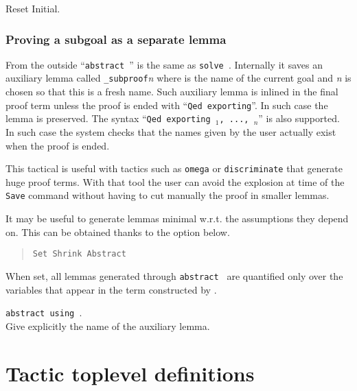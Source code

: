 \begin{coq_eval}
Reset Initial.
\end{coq_eval}

\subsubsection[Proving a subgoal as a separate lemma]{Proving a subgoal as a separate lemma
}

From the outside ``\texttt{abstract \tacexpr}'' is the same as
{\tt solve \tacexpr}. Internally it saves an auxiliary lemma called
{\ident}\texttt{\_subproof}\textit{n} where {\ident} is the name of the
current goal and \textit{n} is chosen so that this is a fresh name.
Such auxiliary lemma is inlined in the final proof term
unless the proof is ended with ``\texttt{Qed exporting}''.  In such
case the lemma is preserved.  The syntax
``\texttt{Qed exporting }\ident$_1$\texttt{, ..., }\ident$_n$''
is also supported.  In such case the system checks that the names given by the
user actually exist when the proof is ended.

This tactical is useful with tactics such as \texttt{omega} or
\texttt{discriminate} that generate huge proof terms. With that tool
the user can avoid the explosion at time of the \texttt{Save} command
without having to cut manually the proof in smaller lemmas.

It may be useful to generate lemmas minimal w.r.t. the assumptions they depend
on. This can be obtained thanks to the option below.

\begin{quote}
{\tt Set Shrink Abstract}
\end{quote}

When set, all lemmas generated through \texttt{abstract {\tacexpr}} are
quantified only over the variables that appear in the term constructed by
\texttt{\tacexpr}.

\begin{Variants}
\item \texttt{abstract {\tacexpr} using {\ident}}.\\
  Give explicitly the name of the auxiliary lemma.
\end{Variants}

\ErrMsg {}

\section[Tactic toplevel definitions]{Tactic toplevel definitions}

